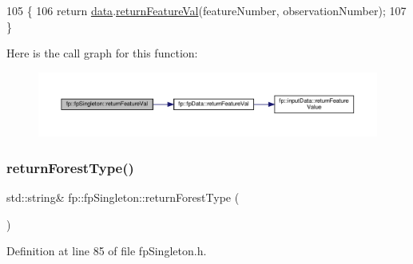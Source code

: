 \begin{DoxyCode}
105                                                                                                 \{
106                 \textcolor{keywordflow}{return} \hyperlink{classfp_1_1fpSingleton_a2fa16ac6a0f66641749032eeee61b8e9}{data}.\hyperlink{classfp_1_1fpData_a6b359086ec1e5c534095600e2ed5575f}{returnFeatureVal}(featureNumber, observationNumber);
107             \}
\end{DoxyCode}
Here is the call graph for this function\+:
\nopagebreak
\begin{figure}[H]
\begin{center}
\leavevmode
\includegraphics[width=350pt]{classfp_1_1fpSingleton_aacc2eb894a219e2fe234743b51fa1a76_cgraph}
\end{center}
\end{figure}
\mbox{\label{classfp_1_1fpSingleton_af7582b20b48b7eb8c0a6b89fbdf170ab}} 
\subsubsection{\texorpdfstring{return\+Forest\+Type()}{returnForestType()}}
{\footnotesize\ttfamily std\+::string\& fp\+::fp\+Singleton\+::return\+Forest\+Type (\begin{DoxyParamCaption}{ }\end{DoxyParamCaption})\hspace{0.3cm}{\ttfamily [inline]}}



Definition at line 85 of file fp\+Singleton.\+h.


